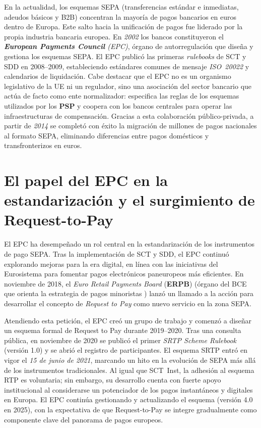 En la actualidad, los esquemas SEPA (transferencias estándar e inmediatas, adeudos básicos y B2B) concentran la mayoría de pagos bancarios en euros dentro de Europa. Este salto hacia la unificación de pagos fue liderado por la propia industria bancaria europea. En \textit{2002} los bancos constituyeron el \textit{\textbf{European Payments Council} (EPC)}, órgano de autorregulación que diseña y gestiona los esquemas SEPA. El EPC publicó las primeras \emph{rulebooks} de SCT y SDD en 2008–2009, estableciendo estándares comunes de mensaje \emph{ISO~20022} y calendarios de liquidación. Cabe destacar que el EPC no es un organismo legislativo de la UE ni un regulador, sino una asociación del sector bancario que actúa de facto como ente normalizador: especifica las reglas de los esquemas utilizados por los \textbf{PSP} y coopera con los bancos centrales para operar las infraestructuras de compensación. Gracias a esta colaboración público-privada, a partir de \textit{2014} se completó con éxito la migración de millones de pagos nacionales al formato SEPA, eliminando diferencias entre pagos domésticos y transfronterizos en euros.

\section{El papel del EPC en la estandarización y el surgimiento de Request-to-Pay}
\label{subsec:epc-rtp}

El EPC ha desempeñado un rol central en la estandarización de los instrumentos de pago SEPA. Tras la implementación de SCT y SDD, el EPC continuó explorando mejoras para la era digital, en línea con las iniciativas del Eurosistema para fomentar pagos electrónicos paneuropeos más eficientes. En noviembre de 2018, el \emph{Euro Retail Payments Board} (\textbf{ERPB}) (órgano del BCE que orienta la estrategia de pagos minoristas \cite{ECB_ERPB}) lanzó un llamado a la acción para desarrollar el concepto de \emph{Request to Pay} como nuevo servicio en la zona SEPA.  

Atendiendo esta petición, el EPC creó un grupo de trabajo y comenzó a diseñar un esquema formal de Request to Pay durante 2019–2020. Tras una consulta pública, en noviembre de 2020 se publicó el primer \emph{SRTP Scheme Rulebook} (versión 1.0) y se abrió el registro de participantes. El esquema SRTP entró en vigor el \textit{15 de junio de 2021}, marcando un hito en la evolución de SEPA más allá de los instrumentos tradicionales. Al igual que SCT~Inst, la adhesión al esquema RTP es voluntaria; sin embargo, su desarrollo cuenta con fuerte apoyo institucional al considerarse un potenciador de los pagos instantáneos y digitales en Europa. El EPC continúa gestionando y actualizando el esquema (versión 4.0 en 2025), con la expectativa de que Request-to-Pay se integre gradualmente como componente clave del panorama de pagos europeos.

